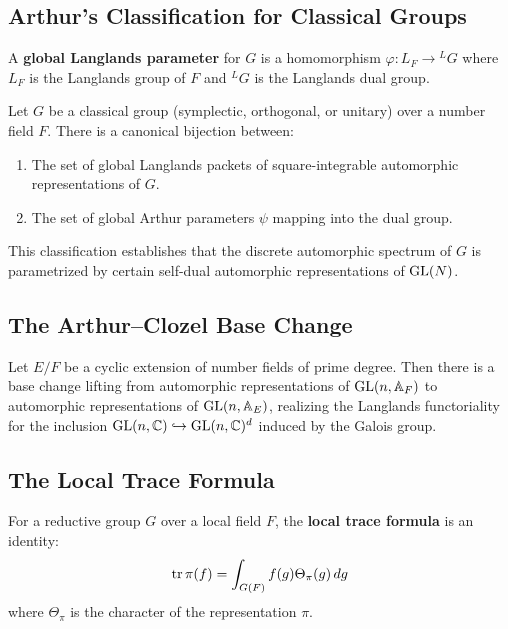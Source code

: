 \subsection{Arthur's Classification for Classical Groups}

\begin{definition}
A \textbf{global Langlands parameter} for $G$ is a homomorphism $\varphi: L_F \to {}^L G$ where $L_F$ is the Langlands group of $F$ and ${}^L G$ is the Langlands dual group.
\end{definition}

\begin{theorem}
Let $G$ be a classical group (symplectic, orthogonal, or unitary) over a number field $F$. There is a canonical bijection between:
\begin{enumerate}
    \item The set of global Langlands packets of square-integrable automorphic representations of $G$.
    \item The set of global Arthur parameters $\psi$ mapping into the dual group.
\end{enumerate}
This classification establishes that the discrete automorphic spectrum of $G$ is parametrized by certain self-dual automorphic representations of $\operatorname{GL}(N)$.
\end{theorem}

\subsection{The Arthur--Clozel Base Change}

\begin{theorem}
Let $E/F$ be a cyclic extension of number fields of prime degree. Then there is a base change lifting from automorphic representations of $\operatorname{GL}(n, \mathbb{A}_F)$ to automorphic representations of $\operatorname{GL}(n, \mathbb{A}_E)$, realizing the Langlands functoriality for the inclusion $\operatorname{GL}(n,\mathbb{C}) \hookrightarrow \operatorname{GL}(n,\mathbb{C})^d$ induced by the Galois group.
\end{theorem}

\subsection{The Local Trace Formula}

\begin{definition}
For a reductive group $G$ over a local field $F$, the \textbf{local trace formula} is an identity:
\[
\operatorname{tr} \pi(f) = \int_{G(F)} f(g) \Theta_\pi(g) \, dg
\]
where $\Theta_\pi$ is the character of the representation $\pi$.
\end{definition}


